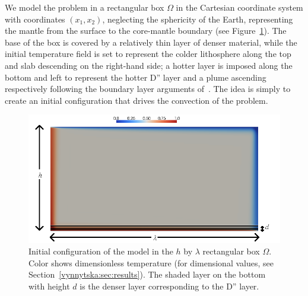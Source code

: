 We model the problem in a rectangular box $\Omega$ in the Cartesian
coordinate system with coordinates $(x_1, x_2)$, neglecting the
sphericity of the Earth, representing the mantle from the surface to
the core-mantle boundary (see Figure~\ref{vynnytska:fig:IC}). The base
of the box is covered by a relatively thin layer of denser material,
while the initial temperature field is set to represent the colder
lithosphere along the top and slab descending on the right-hand side;
a hotter layer is imposed along the bottom and left to represent the
hotter D'' layer and a plume ascending respectively following the
boundary layer arguments of~\citet{KekenEtAl1997}. The idea is simply
to create an initial configuration that drives the convection of the
problem.
\begin{figure}
  \centering
  \includegraphics[width=\largefig]{chapters/vynnytska/png/layout.png}
  \caption{Initial configuration of the model in the $h$ by
    $\lambda$ rectangular box $\Omega$. Color shows dimensionless
    temperature (for dimensional values, see
    Section~\ref{vynnytska:sec:results}). The shaded layer on the
    bottom with height $d$ is the denser layer corresponding to the
    D'' layer.}
  \label{vynnytska:fig:IC}
\end{figure}

